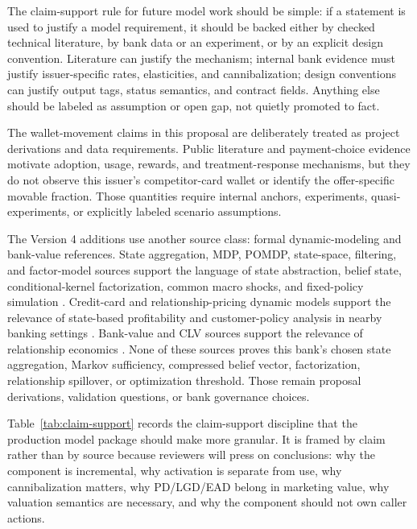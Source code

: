 \documentclass[11pt]{article}
\newcommand{\1}{\mathbf{1}}
\begin{document}
The claim-support rule for future model work should be simple: if a statement
is used to justify a model requirement, it should be backed either by checked
technical literature, by bank data or an experiment, or by an explicit design
convention. Literature can justify the mechanism; internal bank evidence must
justify issuer-specific rates, elasticities, and cannibalization; design
conventions can justify output tags, status semantics, and contract fields.
Anything else should be labeled as assumption or open gap, not quietly promoted
to fact.

The wallet-movement claims in this proposal are deliberately treated as project
derivations and data requirements. Public literature and payment-choice
evidence motivate adoption, usage, rewards, and treatment-response mechanisms,
but they do not observe this issuer's competitor-card wallet or identify the
offer-specific movable fraction. Those quantities require internal anchors,
experiments, quasi-experiments, or explicitly labeled scenario assumptions.

The Version 4 additions use another source class: formal dynamic-modeling and
bank-value references. State aggregation, MDP, POMDP, state-space, filtering,
and factor-model sources support the language of state abstraction, belief
state, conditional-kernel factorization, common macro shocks, and fixed-policy
simulation \citep{bean1987aggregation,puterman1994mdp,smallwood1973pomdp,
kaelbling1998pomdp,durbinkoopman2012ssm,westharrison1997bfdm,doucet2001smc,
ledoux2005recursivefilters,bernankeboivin2003datarich,
bernankeboivineliasz2005favar,stockwatson2005factorvar}. Credit-card and
relationship-pricing dynamic models support the relevance of state-based
profitability and customer-policy analysis in nearby banking settings
\citep{thomas2011creditcardmdp,lewis2005relationshippricing}. Bank-value and
CLV sources support the relevance of relationship economics
\citep{egan2022bankvalue,berger1998clv,rust2004return,venkatesan2004clv}.
None of these sources proves this bank's chosen state aggregation, Markov
sufficiency, compressed belief vector, factorization, relationship spillover,
or optimization threshold. Those remain proposal derivations, validation
questions, or bank governance choices.

Table~\ref{tab:claim-support} records the claim-support discipline that the
production model package should make more granular. It is framed by claim
rather than by source because reviewers will press on conclusions: why the
component is incremental, why activation is separate from use, why
cannibalization matters, why PD/LGD/EAD belong in marketing value, why
valuation semantics are necessary, and why the component should not own caller
actions.
\end{document}

